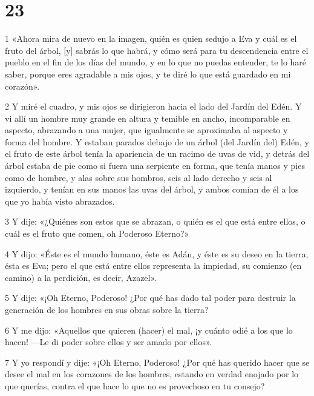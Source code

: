 \chapter{23}

\par 1 «Ahora mira de nuevo en la imagen, quién es quien sedujo a Eva y cuál es el fruto del árbol, [y] sabrás lo que habrá, y cómo será para tu descendencia entre el pueblo en el fin de los días del mundo, y en lo que no puedas entender, te lo haré saber, porque eres agradable a mis ojos, y te diré lo que está guardado en mi corazón».

\par 2 Y miré el cuadro, y mis ojos se dirigieron hacia el lado del Jardín del Edén. Y vi allí un hombre muy grande en altura y temible en ancho, incomparable en aspecto, abrazando a una mujer, que igualmente se aproximaba al aspecto y forma del hombre. Y estaban parados debajo de un árbol (del Jardín del) Edén, y el fruto de este árbol tenía la apariencia de un racimo de uvas de vid, y detrás del árbol estaba de pie como si fuera una serpiente en forma, que tenía manos y pies como de hombre, y alas sobre sus hombros, seis al lado derecho y seis al izquierdo, y tenían en sus manos las uvas del árbol, y ambos comían de él a los que yo había visto abrazados.

\par 3 Y dije: «¿Quiénes son estos que se abrazan, o quién es el que está entre ellos, o cuál es el fruto que comen, oh Poderoso Eterno?»

\par 4 Y dijo: «Éste es el mundo humano, éste es Adán, y éste es su deseo en la tierra, ésta es Eva; pero el que está entre ellos representa la impiedad, su comienzo (en camino) a la perdición, es decir, Azazel».

\par 5 Y dije: «¡Oh Eterno, Poderoso! ¿Por qué has dado tal poder para destruir la generación de los hombres en sus obras sobre la tierra?

\par 6 Y me dijo: «Aquellos que quieren (hacer) el mal, ¡y cuánto odié a los que lo hacen! —Le di poder sobre ellos y ser amado por ellos».

\par 7 Y yo respondí y dije: «¡Oh Eterno, Poderoso! ¿Por qué has querido hacer que se desee el mal en los corazones de los hombres, estando en verdad enojado por lo que querías, contra el que hace lo que no es provechoso en tu consejo?

